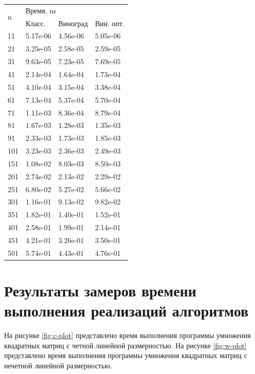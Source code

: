 \begin{table}[ht!]
\begin{subtable}[ht!]{0.45\textwidth}
\begin{tabular}{||l|l|l|l||}
			\hline
			\multirow{2}{*}{n} & \multicolumn{3}{l|}{Время, ns} \\ \cline{2-4} 
			&  Класс. & Виноград & Вин. опт. \\ \hline\hline
			11 & 5.17e-06 & 4.56e-06 & 5.05e-06 \\ \hline 
			21 & 3.25e-05 & 2.58e-05 & 2.59e-05 \\ \hline 
			31 & 9.63e-05 & 7.23e-05 & 7.69e-05 \\ \hline 
			41 & 2.14e-04 & 1.64e-04 & 1.73e-04 \\ \hline 
			51 & 4.10e-04 & 3.15e-04 & 3.38e-04 \\ \hline 
			61 & 7.13e-04 & 5.37e-04 & 5.70e-04 \\ \hline 
			71 & 1.11e-03 & 8.36e-04 & 8.79e-04 \\ \hline 
			81 & 1.67e-03 & 1.28e-03 & 1.35e-03 \\ \hline 
			91 & 2.33e-03 & 1.73e-03 & 1.85e-03 \\ \hline 
			101 & 3.23e-03 & 2.36e-03 & 2.49e-03 \\ \hline 
			151 & 1.08e-02 & 8.03e-03 & 8.50e-03 \\ \hline 
			201 & 2.74e-02 & 2.13e-02 & 2.29e-02 \\ \hline 
			251 & 6.80e-02 & 5.27e-02 & 5.66e-02 \\ \hline 
			301 & 1.16e-01 & 9.13e-02 & 9.82e-02 \\ \hline 
			351 & 1.82e-01 & 1.40e-01 & 1.52e-01 \\ \hline 
			401 & 2.58e-01 & 1.99e-01 & 2.14e-01 \\ \hline 
			451 & 4.21e-01 & 3.26e-01 & 3.50e-01 \\ \hline 
			501 & 5.74e-01 & 4.43e-01 & 4.76e-01 \\ \hline 
		\end{tabular}
		\label{tab:even}
	\end{subtable}
	\label{tab:time}
\end{table} 

\newpage

\section{Результаты замеров времени выполнения реализаций алгоритмов}


На рисунке \ref{fig:c-plot} представлено время выполнения программы умножения квадратных матриц с четной линейной размерностью. 
На рисунке \ref{fig:w-plot} представлено время выполнения программы умножения квадратных матриц с нечетной линейной размерностью.


